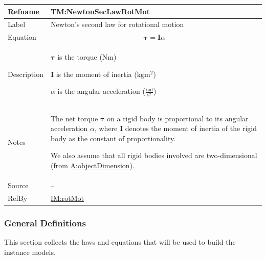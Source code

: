 \documentclass[12pt]{article}
\begin{document}
\vspace{\baselineskip}
\noindent
\begin{minipage}{\textwidth}
\begin{tabular}{>{\raggedright}p{}>{\raggedright\arraybackslash}p{}}
\toprule \textbf{Refname} & \textbf{TM:NewtonSecLawRotMot}
\label{TM:NewtonSecLawRotMot}
\\ \midrule
Label & Newton's second law for rotational motion
        
\\ \midrule
Equation & \begin{displaymath}
           \symbf{τ}=\symbf{I} α
           \end{displaymath}
\\ \midrule
Description & \begin{symbDescription}
              \item{$\symbf{τ}$ is the torque ($\text{N}\text{m}$)}
              \item{$\symbf{I}$ is the moment of inertia ($\text{kg}\text{m}^{2}$)}
              \item{$α$ is the angular acceleration ($\frac{\text{rad}}{\text{s}^{2}}$)}
              \end{symbDescription}
\\ \midrule
Notes & The net torque $\symbf{τ}$ on a rigid body is proportional to its angular acceleration $α$, where $\symbf{I}$ denotes the moment of inertia of the rigid body as the constant of proportionality.
        
        We also assume that all rigid bodies involved are two-dimensional (from \hyperref[assumpOD]{A:objectDimension}).
        
\\ \midrule
Source & --
         
\\ \midrule
RefBy & \hyperref[IM:rotMot]{IM:rotMot}
        
\\ \bottomrule
\end{tabular}
\end{minipage}
\subsubsection{General Definitions}
\label{Sec:GDs}
This section collects the laws and equations that will be used to build the instance models.
\end{document}
